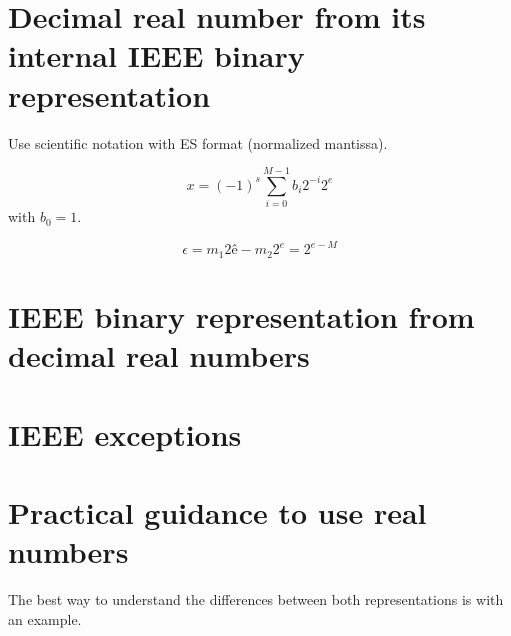 \section{Decimal real number from its internal IEEE binary representation}



Use scientific notation with ES format (normalized mantissa).

$$
   x = (-1) ^s \sum_{i=0}^{M-1}  b_i 2^{-i} 2^e 
$$
with $b_0 = 1$. 

$$
   \epsilon = m_1 2 ê - m_2 2^e  = 2^{e-M} 
$$


\section{IEEE binary representation from decimal real numbers}


\section{IEEE exceptions}





\section{Practical guidance to use real numbers} 


The best way to understand the differences between both representations is with an example. 









